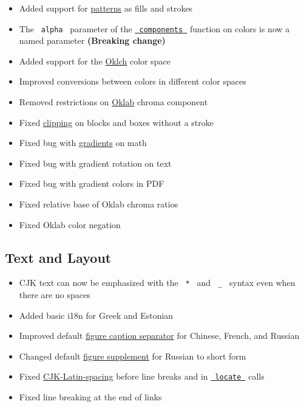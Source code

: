 \begin{itemize}
\tightlist
\item
  Added support for \href{/docs/reference/visualize/pattern/}{patterns}
  as fills and strokes
\item
  The \texttt{\ alpha\ } parameter of the
  \href{/docs/reference/visualize/color/\#definitions-components}{\texttt{\ components\ }}
  function on colors is now a named parameter \textbf{(Breaking change)}
\item
  Added support for the
  \href{/docs/reference/visualize/color/\#definitions-oklch}{Oklch}
  color space
\item
  Improved conversions between colors in different color spaces
\item
  Removed restrictions on
  \href{/docs/reference/visualize/color/\#definitions-oklab}{Oklab}
  chroma component
\item
  Fixed \href{/docs/reference/layout/block/\#parameters-clip}{clipping}
  on blocks and boxes without a stroke
\item
  Fixed bug with \href{/docs/reference/visualize/gradient/}{gradients}
  on math
\item
  Fixed bug with gradient rotation on text
\item
  Fixed bug with gradient colors in PDF
\item
  Fixed relative base of Oklab chroma ratios
\item
  Fixed Oklab color negation
\end{itemize}

\subsection{Text and Layout}\label{text-and-layout}

\begin{itemize}
\tightlist
\item
  CJK text can now be emphasized with the \texttt{\ *\ } and
  \texttt{\ \_\ } syntax even when there are no spaces
\item
  Added basic i18n for Greek and Estonian
\item
  Improved default
  \href{/docs/reference/model/figure/\#definitions-caption-separator}{figure
  caption separator} for Chinese, French, and Russian
\item
  Changed default
  \href{/docs/reference/model/figure/\#parameters-supplement}{figure
  supplement} for Russian to short form
\item
  Fixed
  \href{/docs/reference/text/text/\#parameters-cjk-latin-spacing}{CJK-Latin-spacing}
  before line breaks and in
  \href{/docs/reference/introspection/locate/}{\texttt{\ locate\ }}
  calls
\item
  Fixed line breaking at the end of links
\end{itemize}

